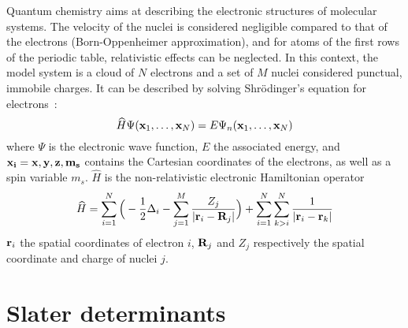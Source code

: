 \documentclass[./thesis.tex]{subfiles}
\begin{document}
Quantum chemistry aims at describing the electronic structures of molecular
systems.  The velocity of the nuclei is considered negligible compared to that
of the electrons (Born-Oppenheimer approximation), and for atoms of the first
rows of the periodic table, relativistic effects can be neglected.  In this
context, the model system is a cloud of $N$ electrons and a set of $M$ nuclei
considered punctual, immobile charges. It can be described by solving
Shrödinger's equation for electrons~:
\begin{equation}
 \widehat{H} \Psi({\bf x}_1,\dots,{\bf x}_N) = E \Psi_n({\bf x}_1,\dots,{\bf x}_N)
\end{equation}
where $\Psi$ is the electronic wave function, $E$ the associated energy, and $\bf{x}_i = {x,y,z,m_s}$
contains the Cartesian coordinates of the electrons, as well as a spin variable $m_s$.
$\widehat H$ is the non-relativistic electronic Hamiltonian operator
\begin{equation}
\widehat{H} = \sum_{i=1}^{N} \Big ( -\frac{1}{2} \Delta_i - \sum_{j=1}^M \frac{Z_j}{|{\bf r}_i - {\bf R}_j|} \Big ) + \sum_{i=1}^{N} \sum_{k>i}^{N} \frac{1}{|{\bf r}_i - {\bf r}_k|}
\end{equation}
${\bf r}_i$ the spatial coordinates of electron $i$, ${\bf R}_j$ and $Z_j$ respectively the spatial coordinate and charge of nuclei $j$.

\section{Slater determinants}
\end{document}
